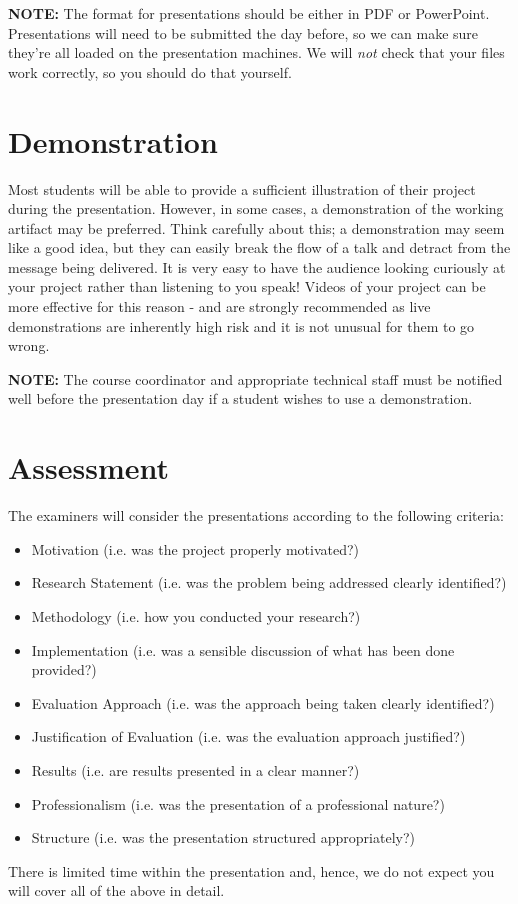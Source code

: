 {\bf NOTE:} The format for presentations should be either in PDF or
PowerPoint.  Presentations will need to be submitted the day before, so we can make sure
they're all loaded on the presentation machines. We will \emph{not} check that
your files work correctly, so you should do that yourself.

\section{Demonstration}

Most students will be able to provide a sufficient illustration of
their project during the presentation.  However, in some cases, a
demonstration of the working artifact may be preferred. Think carefully about
this; a demonstration may seem like a good idea, but they can easily break the
flow of a talk and detract from the message being delivered. It is very easy to
have the audience looking curiously at your project rather than listening to
you speak! Videos of your project can be more effective for this
reason - and are strongly recommended as live demonstrations are
inherently high risk and it is not unusual for them to go wrong.

{\bf NOTE:} The course coordinator and appropriate technical
staff must be notified well before the presentation day if a student wishes
to use a demonstration.

\section{Assessment}
The examiners will consider the presentations according to the following criteria:

\begin{itemize}
\item Motivation (i.e. was the project properly motivated?)
\item Research Statement (i.e. was the problem being addressed clearly
identified?)
\item Methodology (i.e. how you conducted your research?)
\item Implementation (i.e. was a sensible discussion of what has been done provided?)
\item Evaluation Approach (i.e. was the approach being taken clearly identified?)
\item Justification of Evaluation (i.e. was the evaluation approach justified?)
\item Results (i.e. are results presented in a clear manner?)
\item Professionalism (i.e. was the presentation of a professional nature?)
\item Structure (i.e. was the presentation structured appropriately?)
\end{itemize}

 There is limited time within the presentation and, hence,
we do not expect you will cover all of the above in detail.
